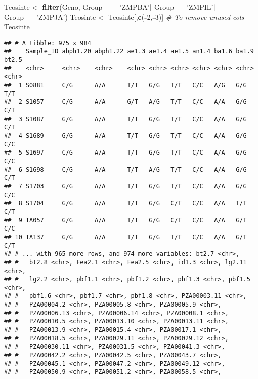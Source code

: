 \documentclass[]{article}
\newenvironment{Shaded}{\begin{snugshade}}{\end{snugshade}}
\newcommand{\KeywordTok}[1]{\textcolor[rgb]{0.13,0.29,0.53}{\textbf{#1}}}
\newcommand{\DecValTok}[1]{\textcolor[rgb]{0.00,0.00,0.81}{#1}}
\newcommand{\StringTok}[1]{\textcolor[rgb]{0.31,0.60,0.02}{#1}}
\newcommand{\CommentTok}[1]{\textcolor[rgb]{0.56,0.35,0.01}{\textit{#1}}}
\newcommand{\OperatorTok}[1]{\textcolor[rgb]{0.81,0.36,0.00}{\textbf{#1}}}
\newcommand{\NormalTok}[1]{#1}
\begin{document}
\begin{Shaded}
\begin{Highlighting}[]
\NormalTok{Teosinte <-}\StringTok{ }\KeywordTok{filter}\NormalTok{(Geno, Group }\OperatorTok{==}\StringTok{ 'ZMPBA'}\OperatorTok{|}\StringTok{ }\NormalTok{Group}\OperatorTok{==}\StringTok{'ZMPIL'}\OperatorTok{|}\StringTok{ }\NormalTok{Group}\OperatorTok{==}\StringTok{'ZMPJA'}\NormalTok{)}
\NormalTok{Teosinte <-}\StringTok{ }\NormalTok{Teosinte[,}\KeywordTok{c}\NormalTok{(}\OperatorTok{-}\DecValTok{2}\NormalTok{,}\OperatorTok{-}\DecValTok{3}\NormalTok{)] }\CommentTok{# To remove unused cols}
\NormalTok{Teosinte}
\end{Highlighting}
\end{Shaded}

\begin{verbatim}
## # A tibble: 975 x 984
##    Sample_ID abph1.20 abph1.22 ae1.3 ae1.4 ae1.5 an1.4 ba1.6 ba1.9 bt2.5
##    <chr>     <chr>    <chr>    <chr> <chr> <chr> <chr> <chr> <chr> <chr>
##  1 S0881     C/G      A/A      T/T   G/G   T/T   C/C   A/G   G/G   T/T  
##  2 S1057     C/G      A/A      G/T   A/G   T/T   C/C   A/A   G/G   C/T  
##  3 S1087     G/G      A/A      T/T   G/G   T/T   C/C   A/A   G/G   C/T  
##  4 S1689     G/G      A/A      T/T   G/G   T/T   C/C   A/A   G/G   C/C  
##  5 S1697     C/G      A/A      T/T   G/G   T/T   C/C   A/A   G/G   C/C  
##  6 S1698     C/G      A/A      T/T   A/G   T/T   C/C   A/A   G/G   C/T  
##  7 S1703     G/G      A/A      T/T   G/G   T/T   C/C   A/A   G/G   C/C  
##  8 S1704     G/G      A/A      T/T   G/G   C/T   C/C   A/A   T/T   C/T  
##  9 TA057     G/G      A/A      T/T   G/G   C/T   C/C   A/A   G/T   C/C  
## 10 TA137     G/G      A/A      T/T   G/G   T/T   C/C   A/A   G/T   C/T  
## # ... with 965 more rows, and 974 more variables: bt2.7 <chr>,
## #   bt2.8 <chr>, Fea2.1 <chr>, Fea2.5 <chr>, id1.3 <chr>, lg2.11 <chr>,
## #   lg2.2 <chr>, pbf1.1 <chr>, pbf1.2 <chr>, pbf1.3 <chr>, pbf1.5 <chr>,
## #   pbf1.6 <chr>, pbf1.7 <chr>, pbf1.8 <chr>, PZA00003.11 <chr>,
## #   PZA00004.2 <chr>, PZA00005.8 <chr>, PZA00005.9 <chr>,
## #   PZA00006.13 <chr>, PZA00006.14 <chr>, PZA00008.1 <chr>,
## #   PZA00010.5 <chr>, PZA00013.10 <chr>, PZA00013.11 <chr>,
## #   PZA00013.9 <chr>, PZA00015.4 <chr>, PZA00017.1 <chr>,
## #   PZA00018.5 <chr>, PZA00029.11 <chr>, PZA00029.12 <chr>,
## #   PZA00030.11 <chr>, PZA00031.5 <chr>, PZA00041.3 <chr>,
## #   PZA00042.2 <chr>, PZA00042.5 <chr>, PZA00043.7 <chr>,
## #   PZA00045.1 <chr>, PZA00047.2 <chr>, PZA00049.12 <chr>,
## #   PZA00050.9 <chr>, PZA00051.2 <chr>, PZA00058.5 <chr>,

\end{verbatim}
\end{document}
